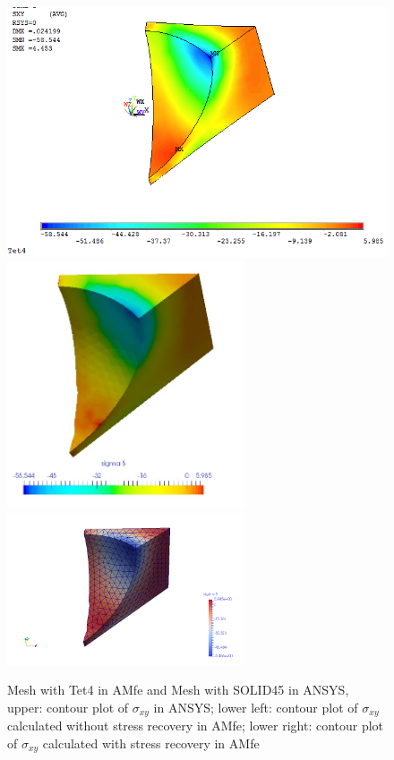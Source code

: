 \begin{figure}[htbp]
	\begin{center}
		\includegraphics[width=13cm,clip]{Tet4Sxy.png} 		
		\includegraphics[width=7cm,clip]{Tet4SxyPD.png} 	
		\includegraphics[width=7cm,clip]{Tet4SxyP.png} 		
		\caption{Mesh with Tet4 in AMfe and Mesh with SOLID45 in ANSYS, upper: contour plot of $\sigma_{xy}$ in ANSYS; lower left: contour plot of $\sigma_{xy}$ calculated without stress recovery in AMfe; lower right: contour plot of $\sigma_{xy}$ calculated with stress recovery in AMfe} \label{fig: Tet4_Sxy}
	\end{center}
\end{figure}
\clearpage 

